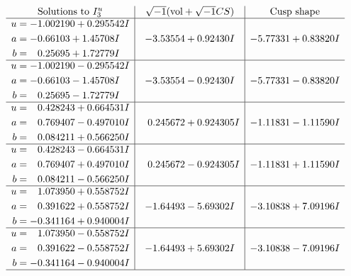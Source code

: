 \documentclass[1p]{elsarticle_modified}
\theoremstyle{definition}
\newcommand{\I}{\sqrt{-1}}
\begin{document}
$$\begin{array}{c|c|c}  
\text{Solutions to }I^u_{3}& \I (\text{vol} + \sqrt{-1}CS) & \text{Cusp shape}\\
 \hline 
\begin{aligned}
u &= -1.002190 + 0.295542 I \\
a &= -0.66103 + 1.45708 I \\
b &= \phantom{-}0.25695 + 1.72779 I\end{aligned}
 & -3.53554 + 0.92430 I & -5.77331 + 0.83820 I \\ \hline\begin{aligned}
u &= -1.002190 - 0.295542 I \\
a &= -0.66103 - 1.45708 I \\
b &= \phantom{-}0.25695 - 1.72779 I\end{aligned}
 & -3.53554 - 0.92430 I & -5.77331 - 0.83820 I \\ \hline\begin{aligned}
u &= \phantom{-}0.428243 + 0.664531 I \\
a &= \phantom{-}0.769407 - 0.497010 I \\
b &= \phantom{-}0.084211 + 0.566250 I\end{aligned}
 & \phantom{-}0.245672 + 0.924305 I & -1.11831 - 1.11590 I \\ \hline\begin{aligned}
u &= \phantom{-}0.428243 - 0.664531 I \\
a &= \phantom{-}0.769407 + 0.497010 I \\
b &= \phantom{-}0.084211 - 0.566250 I\end{aligned}
 & \phantom{-}0.245672 - 0.924305 I & -1.11831 + 1.11590 I \\ \hline\begin{aligned}
u &= \phantom{-}1.073950 + 0.558752 I \\
a &= \phantom{-}0.391622 + 0.558752 I \\
b &= -0.341164 + 0.940004 I\end{aligned}
 & -1.64493 - 5.69302 I & -3.10838 + 7.09196 I \\ \hline\begin{aligned}
u &= \phantom{-}1.073950 - 0.558752 I \\
a &= \phantom{-}0.391622 - 0.558752 I \\
b &= -0.341164 - 0.940004 I\end{aligned}
 & -1.64493 + 5.69302 I & -3.10838 - 7.09196 I\\
 \hline 
 \end{array}$$\newpage\newpage\renewcommand{\arraystretch}{1}
\end{document}
